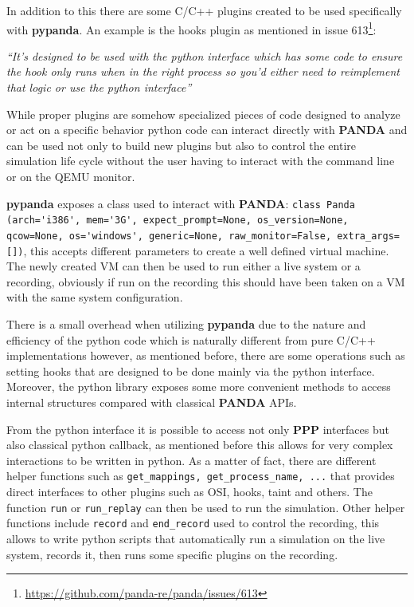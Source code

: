 In addition to this there are some C/C++ plugins created to be used specifically with \textbf{pypanda}. An example is the hooks plugin as mentioned in issue 613\footnote{\url{https://github.com/panda-re/panda/issues/613}}:

\textit{``It's designed to be used with the python interface which has some code to ensure the hook only runs when in the right process so you'd either need to reimplement that logic or use the python interface''}

While proper plugins are somehow specialized pieces of code designed to analyze or act on a specific behavior python code can interact directly with \textbf{PANDA} and can be used not only to build new plugins but also to control the entire simulation life cycle without the user having to interact with the command line or on the QEMU monitor.

\textbf{pypanda} exposes a class used to interact with \textbf{PANDA}: \lstinline{class Panda (arch='i386', mem='3G', expect_prompt=None, os_version=None, qcow=None, os='windows', generic=None, raw_monitor=False, extra_args=[])}, this accepts different parameters to create a well defined virtual machine. The newly created VM can then be used to run either a live system or a recording, obviously if run on the recording this should have been taken on a VM with the same system configuration. 

There is a small overhead when utilizing \textbf{pypanda} due to the nature and efficiency of the python code which is naturally different from pure C/C++ implementations however, as mentioned before, there are some operations such as setting hooks that are designed to be done mainly via the python interface. Moreover, the python library exposes some more convenient methods to access internal structures compared with classical \textbf{PANDA} APIs. 

From the python interface it is possible to access not only \textbf{PPP} interfaces but also classical python callback, as mentioned before this allows for very complex interactions to be written in python. As a matter of fact, there are different helper functions such as \lstinline{get_mappings, get_process_name, ...} that provides direct interfaces to other plugins such as OSI, hooks, taint and others. The function \lstinline{run} or \lstinline{run_replay} can then be used to run the simulation. Other helper functions include \lstinline{record} and \lstinline{end_record} used to control the recording, this allows to write python scripts that automatically run a simulation on the live system, records it, then runs some specific plugins on the recording. 

